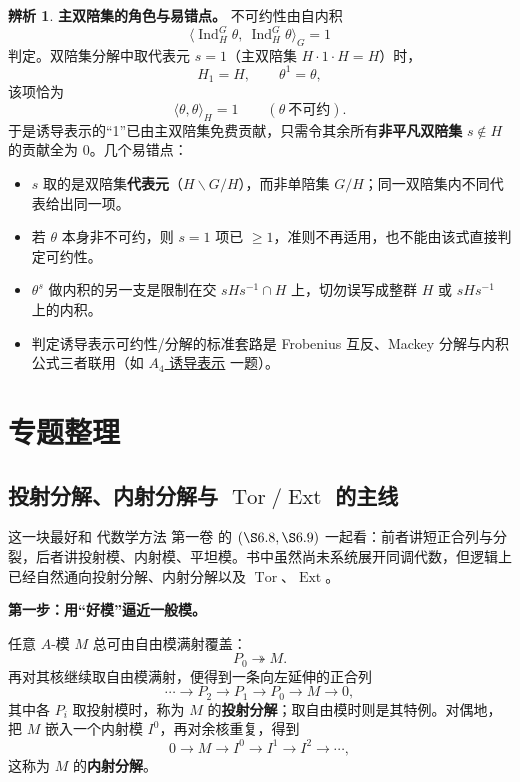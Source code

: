 \documentclass[a4paper]{ctexart}
\theoremstyle{definition}
\theoremstyle{analysis}
\newtheorem{remark}{辨析}[section]
\theoremstyle{plain}
\begin{document}
\begin{remark}
\label{rem:mackey-irreducible-principle}
\textbf{主双陪集的角色与易错点。} 不可约性由自内积
\[
  \langle \operatorname{Ind}_H^G\theta,\ \operatorname{Ind}_H^G\theta\rangle_G=1
\]
判定。双陪集分解中取代表元 \(s=1\)（主双陪集 \(H\cdot 1\cdot H=H\)）时，
\[
  H_1=H,\qquad \theta^1=\theta,
\]
该项恰为
\[
  \langle \theta,\theta\rangle_H=1
  \qquad(\theta\ \text{不可约}).
\]
于是诱导表示的“1”已由主双陪集免费贡献，只需令其余所有\textbf{非平凡双陪集} \(s\notin H\) 的贡献全为 \(0\)。几个易错点：

\begin{itemize}
  \item \(s\) 取的是双陪集\textbf{代表元}（\(H\backslash G/H\)），而非单陪集 \(G/H\)；同一双陪集内不同代表给出同一项。
  \item 若 \(\theta\) 本身非不可约，则 \(s=1\) 项已 \(\ge 1\)，准则不再适用，也不能由该式直接判定可约性。
  \item \(\theta^s\) 做内积的另一支是限制在交 \(sHs^{-1}\cap H\) 上，切勿误写成整群 \(H\) 或 \(sHs^{-1}\) 上的内积。
  \item 判定诱导表示可约性/分解的标准套路是 Frobenius 互反、Mackey 分解与内积公式三者联用（如 \hyperref[subsec:problem-serre-a4-induced-klein]{\(A_4\) 诱导表示} 一题）。
\end{itemize}
\end{remark}

\newpage
\section{专题整理}

\subsection{\texorpdfstring{投射分解、内射分解与 \(\operatorname{Tor}/\operatorname{Ext}\) 的主线}{投射分解、内射分解与 Tor/Ext 的主线}}\label{subsec:topic-derived-functors}

这一块最好和 \(\textit{代数学方法 第一卷}\) 的 \((\S 6.8,\S 6.9)\) 一起看：前者讲短正合列与分裂，后者讲投射模、内射模、平坦模。书中虽然尚未系统展开同调代数，但逻辑上已经自然通向投射分解、内射分解以及 \(\operatorname{Tor}\)、\(\operatorname{Ext}\)。

\medskip

\textbf{第一步：用“好模”逼近一般模。}

任意 \(A\)-模 \(M\) 总可由自由模满射覆盖：
\[
  P_0\twoheadrightarrow M.
\]
再对其核继续取自由模满射，便得到一条向左延伸的正合列
\[
  \cdots \to P_2\to P_1\to P_0\to M\to 0,
\]
其中各 \(P_i\) 取投射模时，称为 \(M\) 的\textbf{投射分解}；取自由模时则是其特例。对偶地，把 \(M\) 嵌入一个内射模 \(I^0\)，再对余核重复，得到
\[
  0\to M\to I^0\to I^1\to I^2\to \cdots,
\]
这称为 \(M\) 的\textbf{内射分解}。
\end{document}
